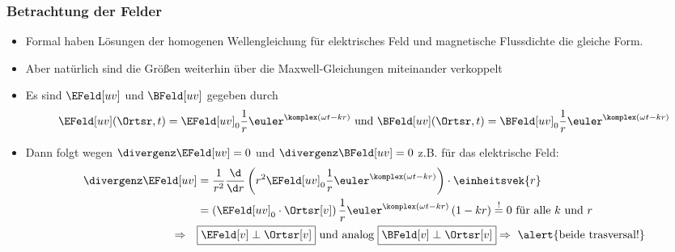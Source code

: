 \begin{frame}
  \frametitle{Betrachtung der Felder}
  \begin{itemize}[<+->]
  \item Formal haben Lösungen der homogenen Wellengleichung für elektrisches Feld und magnetische Flussdichte die \alert{gleiche Form}.
  \item Aber natürlich sind die Größen weiterhin über die Maxwell-Gleichungen miteinander \alert{verkoppelt}
  \item Es sind \(\EFeld[uv]\) und \(\BFeld[uv]\) gegeben durch
    \begin{equation*}
      \EFeld[uv](\Ortsr, t) = \EFeld[uv]_0 \frac{1}{r} \euler^{\komplex(\omega t - kr)} \text{ und } \BFeld[uv](\Ortsr, t) = \BFeld[uv]_0 \frac{1}{r} \euler^{\komplex(\omega t - kr)}
    \end{equation*}
  \item Dann folgt wegen \(\divergenz \EFeld[uv] = 0\) und \(\divergenz\BFeld[uv]=0\) z.B. für das elektrische Feld:
     \begin{align*}
      \divergenz \EFeld[uv]  & = \frac{1}{r^2} \frac{\d}{\d r} \left( r^2 \EFeld[uv]_0 \frac{1}{r} \euler^{\komplex(\omega t -kr)} \right) \cdot \einheitsvek{r} \\
                             &= \left( \EFeld[uv]_0 \cdot \Ortsr[v] \right) \frac{1}{r} \euler^{\komplex(\omega t -kr)} \left(1- kr \right) \stackrel{!}{=} 0 \text{ für alle } k \text{ und } r  \\
       \Rightarrow \quad & \boxed{\EFeld[v] \perp \Ortsr[v]} \text{ und analog } \boxed{\BFeld[v] \perp \Ortsr[v]} \Rightarrow \text{ \alert{beide trasversal!}}
       \end{align*}
     \end{itemize}
  \end{frame}

